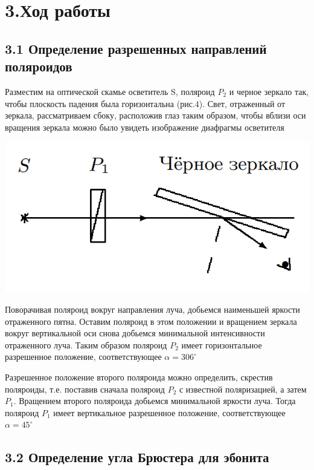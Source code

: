 \documentclass[a4paper,12pt]{report}
\begin{document}
\section*{3.Ход работы}

\subsection*{3.1 Определение разрешенных направлений поляроидов}

Разместим на оптической скамье осветитель S, поляроид $P_{2}$ и черное зеркало так, чтобы плоскость падения была горизонтальна (рис.4). Свет, отраженный от зеркала, рассматриваем сбоку, расположив глаз таким образом, чтобы вблизи оси вращения зеркала можно было увидеть изображение диафрагмы осветителя

\begin{center}
    \includegraphics[scale = 0.5]{1.png}
\end{center}

Поворачивая поляроид вокруг направления луча, добьемся наименьшей яркости отраженного пятна. Оставим поляроид в этом положении и вращением зеркала вокруг вертикальной оси снова добьемся минимальной интенсивности отраженного луча.
Таким образом поляроид $P_{2}$ имеет горизонтальное разрешенное положение, соответствующее $\alpha = 306^{\circ}$

Разрешенное положение второго поляроида можно определить, скрестив поляроиды, т.е. поставив сначала поляроид $P_{2}$ с известной поляризацией, а затем $P_{1}$. Вращением второго поляроида добьемся минимальной яркости луча.
Тогда поляроид $P_{1}$ имеет вертикальное разрешенное положение, соответствующее $\alpha = 45^{\circ}$

\subsection*{3.2 Определение угла Брюстера для эбонита}
\end{document}
